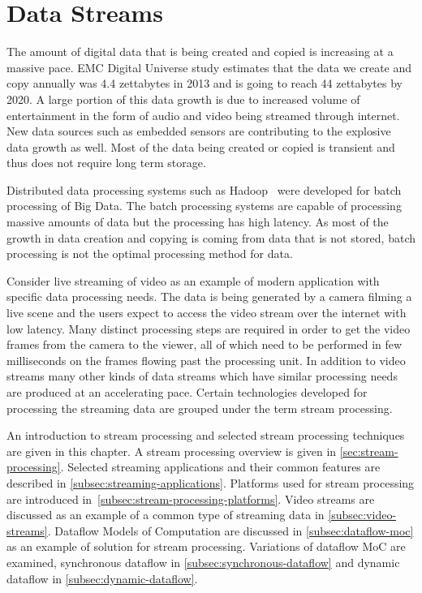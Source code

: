 \chapter{Data Streams}
\label{chapter:streams}
The amount of digital data that is being created and copied is increasing at a massive pace. EMC Digital Universe study \cite{turner2014digital} estimates that the data we create and copy annually was 4.4 zettabytes in 2013 and is going to reach 44 zettabytes by 2020. A large portion of this data growth is due to increased volume of entertainment in the form of audio and video being streamed through internet. New data sources such as embedded sensors are contributing to the explosive data growth as well. Most of the data being created or copied is transient and thus does not require long term storage.~\cite{turner2014digital}

Distributed data processing systems such as Hadoop~\cite{white2012hadoop} were developed for batch processing of Big Data. The batch processing systems are capable of processing massive amounts of data but the processing has high latency. As most of the growth in data creation and copying is coming from data that is not stored, batch processing is not the optimal processing method for data.

Consider live streaming of video as an example of modern application with specific data processing needs. The data is being generated by a camera filming a live scene and the users expect to access the video stream over the internet with low latency. Many distinct processing steps are required in order to get the video frames from the camera to the viewer, all of which need to be performed in few milliseconds on the frames flowing past the processing unit. In addition to video streams many other kinds of data streams which have similar processing needs are produced at an accelerating pace. Certain technologies developed for processing the streaming data are grouped under the term stream processing.

An introduction to stream processing and selected stream processing techniques are given in this chapter. A stream processing overview is given in \ref{sec:stream-processing}. Selected streaming applications and their common features are described in \ref{subsec:streaming-applications}. Platforms used for stream processing are introduced in~\ref{subsec:stream-processing-platforms}. Video streams are discussed as an example of a common type of streaming data in \ref{subsec:video-streams}. Dataflow Models of Computation are discussed in \ref{subsec:dataflow-moc} as an example of solution for stream processing. Variations of dataflow MoC are examined, synchronous dataflow in \ref{subsec:synchronous-dataflow} and dynamic dataflow in \ref{subsec:dynamic-dataflow}.

